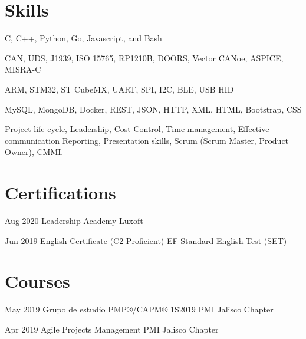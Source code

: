 \documentclass[10pt, letterpaper]{article} %
\begin{document}

\section{Skills}

{C, C++, Python, Go, Javascript, and Bash}
{}


{CAN, UDS, J1939, ISO 15765, RP1210B, DOORS, Vector CANoe, ASPICE, MISRA-C}
{}


{ARM, STM32, ST CubeMX, UART, SPI, I2C, BLE, USB HID}
{}

{MySQL, MongoDB, Docker, REST, JSON, HTTP, XML, HTML, Bootstrap, CSS}
{}

{Project life-cycle, Leadership, Cost Control, Time management, Effective communication}
{Reporting, Presentation skills, Scrum (Scrum Master, Product Owner), CMMI. }



\section{Certifications}

\dateitem
{Aug 2020}
{Leadership Academy}
{Luxoft}

\dateitem
{Jun 2019}
{English Certificate (C2 Proficient)}
{\href{https://www.efset.org/cert/BAUjza}{EF Standard English Test (SET)}}


\section{Courses}

\dateitem
{May 2019}
{Grupo de estudio PMP®/CAPM® 1S2019}
{PMI Jalisco Chapter}

\dateitem
{Apr 2019}
{Agile Projects Management}
{PMI Jalisco Chapter}
\end{document}
